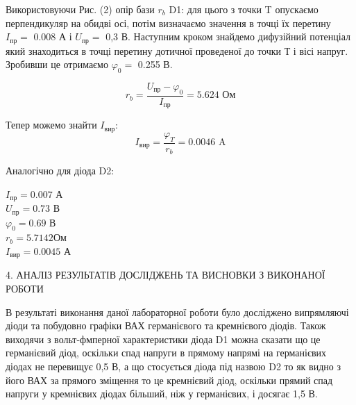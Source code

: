 \documentclass[14pt,a4paper]{scrartcl}
\begin{document}
Використовуючи Рис. (2)  опір бази $r_b$ D1: для цього з точки T опускаємо перпендикуляр на обидві осі, потім визначаємо значення в точці їх перетину $I_{\text{пр}} = $ 0.008 А і $U_{\text{пр}} = $ 0,3 В. Наступним кроком знайдемо дифузійний потенціал який знаходиться в точці перетину дотичної проведеної до точки Т і вісі напруг. Зробивши це отримаємо $\varphi_0 = $ 0.255 В.

\begin{equation}
r_b = \dfrac{U_{\text{пр}} - \varphi_0}{I_{\text{пр}}} = 5.624 \text{ Ом}
\label{eq:ref}
\end{equation}

Тепер можемо знайти $I_{\text{вир}}$:
\begin{equation}
I_{\text{вир}} = \dfrac{\varphi_T}{r_b} = 0.0046 \text{ A}
\label{eq:ref}
\end{equation}

Аналогічно для діода D2:
\begin{center}
$I_{\text{пр}} = 0.007$ А\\
\vspace{0.3cm}
$U_{\text{пр}} = 0.73$ В\\
\vspace{0.3cm}
$\varphi_0 = 0.69$ В\\
\vspace{0.3cm}
$r_b =  5.7142 $Ом\\
\vspace{0.3cm}
$I_{\text{вир}} =0.0045$ А\\
\vspace{0.3cm}
\label{eq:ref}
\end{center}




\clearpage
\newpage
\begin{center}4. АНАЛІЗ РЕЗУЛЬТАТІВ ДОСЛІДЖЕНЬ ТА ВИСНОВКИ З ВИКОНАНОЇ РОБОТИ\\ \end{center}

В результаті виконання даної лабораторної роботи було досліджено випрямляючі діоди та побудовно графіки ВАХ германієвого та кремнієвого діодів. Також виходячи з вольт-фмперної характеристики діода D1 можна сказати що це германієвий діод, оскільки спад напруги в прямому напрямі на германієвих діодах не перевищує 0,5 В, а що стосується діода під назвою D2 то як видно з його ВАХ за прямого зміщення то це кремнієвий діод, оскільки прямий спад напруги у кремнієвих діодах більший, ніж у германієвих, і досягає 1,5 В.
\end{document}
